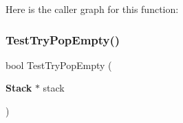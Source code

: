Here is the caller graph for this function\+:
\mbox{\label{tests_8cpp_a2a1c0b9e5ed521fc87c522375bc335d1}} 
\subsubsection{Test\+Try\+Pop\+Empty()}
{\footnotesize\ttfamily bool Test\+Try\+Pop\+Empty (\begin{DoxyParamCaption}\item[{\textbf{ Stack} $\ast$}]{stack }\end{DoxyParamCaption})}

